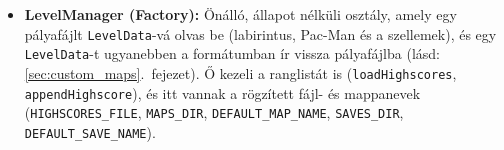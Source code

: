 \documentclass[11pt, a4paper]{article}
\begin{document}
\begin{itemize}
\begin{itemize}
        \item \textbf{BACK:} visszalép a menübe; ha a pályán mentetlen változás van (\texttt{unsaved}), előbb rákérdez. A \texttt{GamePanel}-hez hasonlóan a szerkesztő sem ismeri a \texttt{MainFrame}-et: a „vissza a menübe” műveletet \texttt{Runnable}-ként kapja meg (\texttt{onBack}).
    \end{itemize}
    \item \textbf{LevelManager (Factory):} Önálló, állapot nélküli osztály, amely egy pályafájlt \texttt{LevelData}-vá olvas be (labirintus, Pac-Man és a szellemek), és egy \texttt{LevelData}-t ugyanebben a formátumban ír vissza pályafájlba (lásd: \ref{sec:custom_maps}.~fejezet). Ő kezeli a ranglistát is (\texttt{loadHighscores}, \texttt{appendHighscore}), és itt vannak a rögzített fájl- és mappanevek (\texttt{HIGHSCORES\_FILE}, \texttt{MAPS\_DIR}, \texttt{DEFAULT\_MAP\_NAME}, \texttt{SAVES\_DIR}, \texttt{DEFAULT\_SAVE\_NAME}).
\end{itemize}
\end{document}
